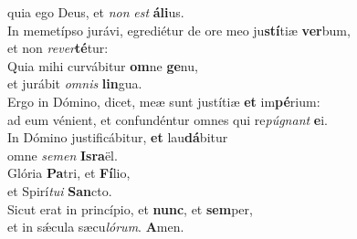 \evenverse quia ego Deus, et \textit{non} \textit{est} \textbf{á}\textbf{li}us.\\
\oddverse In memetípso jurávi, egrediétur de ore meo ju\textbf{stí}tiæ \textbf{ver}bum,~\*\\
\oddverse et non \textit{re}\textit{ver}\textbf{té}tur:\\
\evenverse Quia mihi curvábitur \textbf{om}ne \textbf{ge}nu,~\*\\
\evenverse et jurábit \textit{om}\textit{nis} \textbf{lin}gua.\\
\oddverse Ergo in Dómino, dicet, meæ sunt justítiæ \textbf{et} im\textbf{pé}rium:~\*\\
\oddverse ad eum vénient, et confundéntur omnes qui re\textit{pú}\textit{gnant} \textbf{e}i.\\
\evenverse In Dómino justificábitur, \textbf{et} lau\textbf{dá}bitur~\*\\
\evenverse omne \textit{se}\textit{men} \textbf{Is}\textbf{ra}ël.\\
\oddverse Glória \textbf{Pa}tri, et \textbf{Fí}lio,~\*\\
\oddverse et Spirí\textit{tu}\textit{i} \textbf{San}cto.\\
\evenverse Sicut erat in princípio, et \textbf{nunc}, et \textbf{sem}per,~\*\\
\evenverse et in sǽcula sæcu\textit{ló}\textit{rum}. \textbf{A}men.\\

